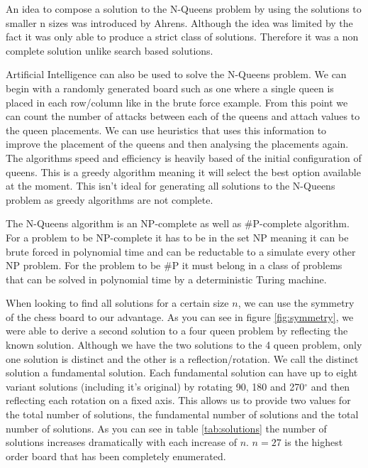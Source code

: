 An idea to compose a solution to the N-Queens problem by using the solutions to smaller n sizes was introduced by Ahrens\cite{ahrens}. Although the idea was limited by the fact it was only able to produce a strict class of solutions. Therefore it was a non complete solution unlike search based solutions.
		
Artificial Intelligence can also be used to solve the N-Queens problem\cite{sosic1990polynomial}. We can begin with a randomly generated board such as one where a single queen is placed in each row/column like in the brute force example. From this point we can count the number of attacks between each of the queens and attach values to the queen placements. We can use heuristics that uses this information to improve the placement of the queens and then analysing the placements again. The algorithms speed and efficiency is heavily based of the initial configuration of queens. This is a greedy algorithm meaning it will select the best option available at the moment. This isn't ideal for generating all solutions to the N-Queens problem as greedy algorithms are not complete.
		
The N-Queens algorithm is an NP-complete as well as \#P-complete algorithm. For a problem to be NP-complete it has to be in the set NP meaning it can be brute forced in polynomial time and can be reductable to a simulate every other NP problem. For the problem to be \#P it must belong in a class of problems that can be solved in polynomial time by a deterministic Turing machine.
		

		
When looking to find all solutions for a certain size \(n\), we can use the symmetry of the chess board to our advantage. As you can see in figure \ref{fig:symmetry}, we were able to derive a second solution to a four queen problem by reflecting the known solution. Although we have the two solutions to the 4 queen problem, only one solution is distinct and the other is a reflection/rotation. We call the distinct solution a fundamental solution. Each fundamental solution can have up to eight variant solutions (including it's original) by rotating 90, 180 and 270$^{\circ}$ and then reflecting each rotation on a fixed axis. This allows us to provide two values for the total number of solutions, the fundamental number of solutions and the total number of solutions. As you can see in table \ref{tab:solutions} the number of solutions increases dramatically with each increase of \(n\). \(n=27\) is the highest order board that has been completely enumerated. 

